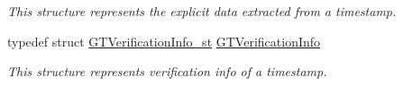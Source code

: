 \begin{DoxyCompactItemize}
\begin{DoxyCompactList}\small\item\em This structure represents the explicit data extracted from a timestamp. \item\end{DoxyCompactList}\item 
\hypertarget{group__verification_ga54ec3cb4a9e8bdfd7400116440e23b36}{
typedef struct \hyperlink{struct_g_t_verification_info__st}{GTVerificationInfo\_\-st} \hyperlink{group__verification_ga54ec3cb4a9e8bdfd7400116440e23b36}{GTVerificationInfo}}
\label{group__verification_ga54ec3cb4a9e8bdfd7400116440e23b36}

\begin{DoxyCompactList}\small\item\em This structure represents verification info of a timestamp. \item\end{DoxyCompactList}\end{DoxyCompactItemize}
